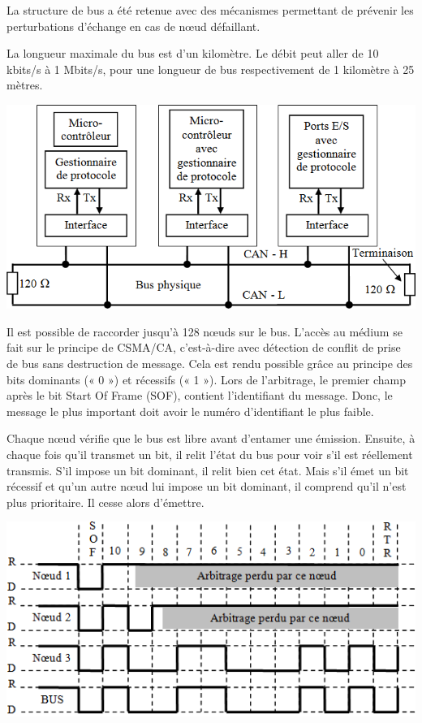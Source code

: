 \documentclass[10pt]{article}
\begin{document}
La structure de bus a été retenue avec des mécanismes permettant de prévenir les perturbations d’échange en cas de nœud défaillant.

La longueur maximale du bus est d’un kilomètre. Le débit peut aller de 10 kbits/s à 1 Mbits/s, pour une longueur de bus respectivement de 1 kilomètre à 25 mètres.

\begin{center}
\includegraphics[width=.8\textwidth]{images/fig_17}
\end{center}


Il est possible de raccorder jusqu’à 128 nœuds sur le bus.
L’accès au médium se fait sur le principe de CSMA/CA, c'est-à-dire avec détection de conflit de prise de bus sans destruction de message. Cela est rendu possible grâce au principe des bits dominants (« 0 ») et récessifs (« 1 »). Lors de l’arbitrage, le premier champ après le bit Start Of Frame (SOF), contient l’identifiant du message. Donc, le message le plus important doit avoir le numéro d’identifiant le plus faible.

Chaque nœud vérifie que le bus est libre avant d’entamer une émission. Ensuite, à chaque fois qu’il transmet un bit, il relit l’état du bus pour voir s’il est réellement transmis. S’il impose un bit dominant, il relit bien cet état. Mais s’il émet un bit récessif et qu’un autre nœud lui impose un bit dominant, il comprend qu’il n’est plus prioritaire. Il cesse alors d’émettre.

\begin{center}
\includegraphics[width=.8\textwidth]{images/fig_18}
\end{center}
\end{document}
